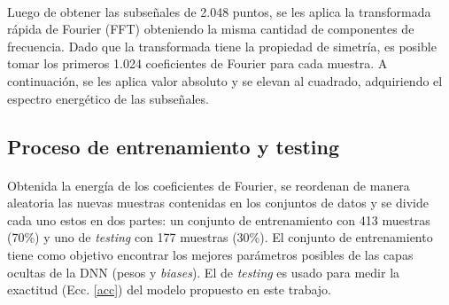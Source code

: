 \documentclass[12pt]{article}%
\begin{document}
\begin{table}
\caption{Descripción de los 5 \textit{datasets}.}
\label{table:tdatasets}
\end{table}

\paragraph{}
Luego de obtener las subseñales de 2.048 puntos, se les aplica la transformada rápida de Fourier (FFT) obteniendo la misma cantidad de componentes de frecuencia. Dado que la transformada tiene la propiedad de simetría, es posible tomar los primeros 1.024 coeficientes de Fourier para cada muestra. A continuación, se les aplica valor absoluto y se elevan al cuadrado, adquiriendo el espectro energético de las subseñales.

\subsection{Proceso de entrenamiento y testing}
\paragraph{}
Obtenida la energía de los coeficientes de Fourier, se reordenan de manera aleatoria las nuevas muestras contenidas en los conjuntos de datos y se divide cada uno estos en dos partes: un conjunto de entrenamiento con 413 muestras (70\%) y uno de \textit{testing} con 177 muestras (30\%). El conjunto de entrenamiento tiene como objetivo encontrar los mejores parámetros posibles de las capas ocultas de la DNN (pesos y \textit{biases}). El de \textit{testing} es usado para medir la exactitud (Ecc. \ref{acc}) del modelo propuesto en este trabajo.
\end{document}

